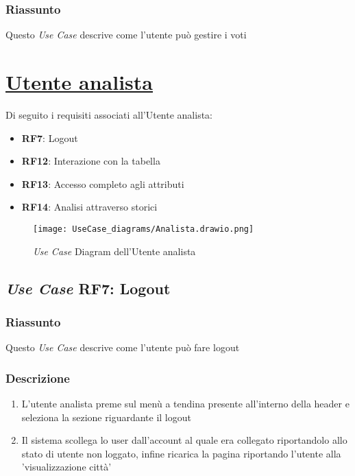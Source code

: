         \subsubsection{Riassunto}
            Questo \textit{Use Case} descrive come l'utente può gestire i voti


\section{\underline{Utente analista}}
    Di seguito i requisiti associati all'Utente analista:
    \begin{itemize}
        \item \textbf{RF7}: Logout
        \item \textbf{RF12}: Interazione con la tabella
        \item \textbf{RF13}: Accesso completo agli attributi
        \item \textbf{RF14}: Analisi attraverso storici
    \end{itemize}
    \begin{figure}[H]
        \centering
        \texttt{[image: UseCase\_diagrams/Analista.drawio.png]}
        \caption{\textit{Use Case} Diagram dell'Utente analista}
    \end{figure}

    \subsection{\textit{Use Case} RF7: Logout}
        \subsubsection{Riassunto}
            Questo \textit{Use Case} descrive come l'utente può fare logout
        \subsubsection{Descrizione}
            \begin{enumerate}
                \item L'utente analista preme sul menù a tendina presente all'interno della header e seleziona la sezione riguardante il logout
                \item Il sistema scollega lo user dall'account al quale era collegato riportandolo allo stato di utente non loggato, infine 
                ricarica la pagina riportando l'utente alla 'visualizzazione città'
            \end{enumerate}

